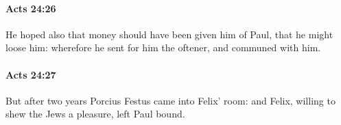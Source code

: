 		\paragraph{Acts 24:26} %
			\label{ACTS-24-26}

			He hoped also that money should have been given him of Paul, that he might loose him: wherefore he sent for him the oftener, and communed with him.

			\begin{framed}
			\scriptsize
				\begin{compactdesc}
					\item[SBLG] 
				\end{compactdesc}
			\end{framed}

		\paragraph{Acts 24:27} %
			\label{ACTS-24-27}

			But after two years Porcius Festus came into Felix' room: and Felix, willing to shew the Jews a pleasure, left Paul bound.

